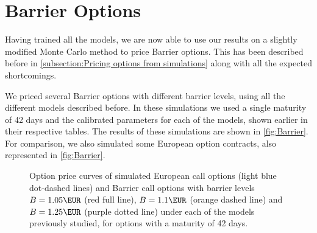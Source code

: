 \section{Barrier Options}

Having trained all the models, we are now able to use our results on a slightly modified Monte Carlo method to price Barrier options. This has been described before in \autoref{subsection:Pricing options from simulations} along with all the expected shortcomings.

We priced several Barrier options with different barrier levels, using all the different models described before. In these simulations we used a single maturity of 42 days and the calibrated parameters for each of the models, shown earlier in their respective tables. The results of these simulations are shown in \autoref{fig:Barrier}.
For comparison, we also simulated some European option contracts, also represented in \autoref{fig:Barrier}.


\iffalse
From the Barrier option prices we extracted the corresponding implied volatilities, using eqs.\eqref{impvolform} and \eqref{barr2}, to compare the implied volatility curves with those shown in the previous sections.
We should also note that these curves are simulated (mean of multiple Monte Carlo simulations) and not theoretical, as there are no closed-form solutions for the prices of Barrier options under each of the used models.
\fi


\vfill
\newpage

\begin{figure}[H]
  \begin{subfigmatrix}{2}
  \end{subfigmatrix}
    \caption[Option price curves of simulated European call options and Barrier call options with different barrier levels under each of the models previously studied.]{Option price curves of simulated European call options (light blue dot-dashed lines) and Barrier call options with barrier levels $B=1.05\EUR$ (red full line), $B=1.1\EUR$ (orange dashed line) and $B=1.25\EUR$ (purple dotted line) under each of the models previously studied, for options with a maturity of 42 days.}\label{fig:Barrier}
\end{figure} 


